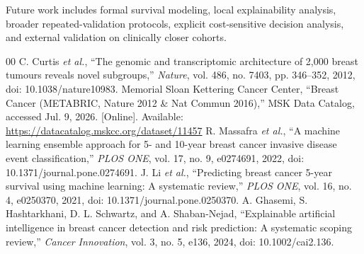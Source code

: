 \documentclass[conference]{IEEEtran}
\begin{document}
Future work includes formal survival modeling, local explainability analysis, broader repeated-validation protocols, explicit cost-sensitive decision analysis, and external validation on clinically closer cohorts.

\begin{thebibliography}{00}
 C. Curtis \textit{et al.}, ``The genomic and transcriptomic architecture of 2,000 breast tumours reveals novel subgroups,'' \textit{Nature}, vol. 486, no. 7403, pp. 346--352, 2012, doi: 10.1038/nature10983.
 Memorial Sloan Kettering Cancer Center, ``Breast Cancer (METABRIC, Nature 2012 \& Nat Commun 2016),'' MSK Data Catalog, accessed Jul. 9, 2026. [Online]. Available: \url{https://datacatalog.mskcc.org/dataset/11457}
 R. Massafra \textit{et al.}, ``A machine learning ensemble approach for 5- and 10-year breast cancer invasive disease event classification,'' \textit{PLOS ONE}, vol. 17, no. 9, e0274691, 2022, doi: 10.1371/journal.pone.0274691.
 J. Li \textit{et al.}, ``Predicting breast cancer 5-year survival using machine learning: A systematic review,'' \textit{PLOS ONE}, vol. 16, no. 4, e0250370, 2021, doi: 10.1371/journal.pone.0250370.
 A. Ghasemi, S. Hashtarkhani, D. L. Schwartz, and A. Shaban-Nejad, ``Explainable artificial intelligence in breast cancer detection and risk prediction: A systematic scoping review,'' \textit{Cancer Innovation}, vol. 3, no. 5, e136, 2024, doi: 10.1002/cai2.136.
\end{thebibliography}
\end{document}
